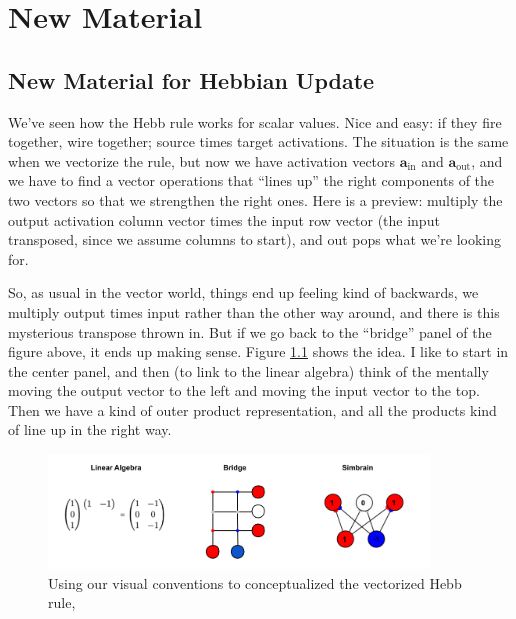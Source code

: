 \chapter{New Material}


\section{New Material for Hebbian Update}

We've seen how the Hebb rule works for scalar values. Nice and easy: if they fire together, wire together; source times target activations.  The situation is the same when we vectorize the rule, but now we have activation vectors $\mathbf{a}_{\text{in}}$ and $\mathbf{a}_{\text{out}}$, and we have to find a vector operations that ``lines up'' the right components of the two vectors so that we strengthen the right ones.  Here is a preview: multiply the output activation column vector times the input row vector (the input transposed, since we assume columns to start), and out pops what we're looking for. 

So, as usual in the vector world, things end up feeling kind of backwards, we multiply output times input rather than the other way around, and there is this mysterious transpose thrown in.  But if we go back to the ``bridge'' panel of the figure above, it ends up making sense. Figure \ref{vectorizedHebb} shows the idea. I like to start in the center panel, and then (to link to the linear algebra) think of the mentally moving the output vector to the left and moving the input vector to the top. Then we have a kind of outer product representation, and all the products kind of line up in the right way. 


\begin{figure}[h]
\centering
\includegraphics[width=0.9\textwidth]{images/vectorizedHebb.png}
\caption[Jeff Yoshimi.]{Using our visual conventions to conceptualized the vectorized Hebb rule,}
\label{vectorizedHebb}
\end{figure}

